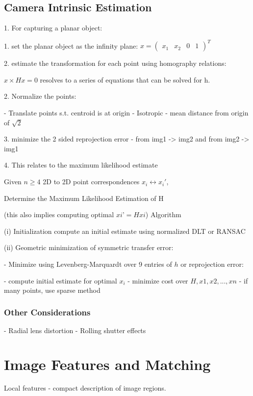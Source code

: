 \subsection{Camera Intrinsic Estimation}
1. For capturing a planar object:

   1. set the planar object as the infinity plane: $x = ( \begin{matrix} x_1 & x_2 & 0 & 1 \end{matrix})^T$

   2. estimate the transformation for each point using homography relations:

      $ x \times H x = 0$ resolves to a series of equations that can be solved for h.

2. Normalize the points:

   - Translate points s.t. centroid is at origin
   - Isotropic - mean distance from origin of $\sqrt 2 $

3. minimize the 2 sided reprojection error - from img1 -> img2 and from img2 -> img1

4. This relates to the maximum likelihood estimate

 Given $n\ge 4$ 2D to 2D point correspondences {$x_i\leftrightarrow x_i\prime$},

Determine the Maximum Likelihood Estimation of H

(this also implies computing optimal $xi’=Hxi$) Algorithm

(i) Initialization compute an initial estimate using normalized DLT or RANSAC

(ii) Geometric minimization of symmetric transfer error: 

- Minimize using Levenberg-Marquardt over 9 entries of $h$ or reprojection error:

- compute initial estimate for optimal $x_i$
- minimize cost over ${H,x1,x2,...,xn}$
- if many points, use sparse method

\subsubsection{Other Considerations}

- Radial lens distortion
- Rolling shutter effects

\section{Image Features and Matching}

Local features - compact description of image regions.


